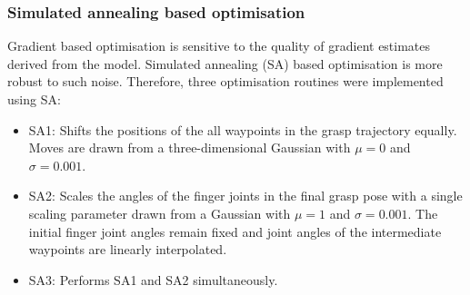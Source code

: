 \subsubsection{Simulated annealing based optimisation}
\noindent
Gradient based optimisation is sensitive to the quality of gradient estimates derived from the model. Simulated annealing (SA) based optimisation is more robust to such noise. Therefore, three optimisation routines were implemented using SA:
\begin{itemize}
\item SA1: Shifts the positions of the all waypoints in the grasp trajectory equally. Moves are drawn from a three-dimensional Gaussian with $\mu=0$ and $\sigma=0.001$. 
\item SA2: Scales the angles of the finger joints in the final grasp pose with a single scaling parameter drawn from a Gaussian with $\mu=1$ and $\sigma=0.001$. The initial finger joint angles remain fixed and joint angles of the intermediate waypoints are linearly interpolated. 
\item SA3: Performs SA1 and SA2 simultaneously.
\end{itemize}

